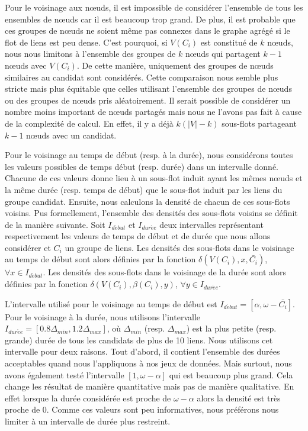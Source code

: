 Pour le voisinage aux n\oe uds, il est impossible de considérer l'ensemble de tous les ensembles de n\oe uds car il est beaucoup trop grand.
De plus, il est probable que ces groupes de n\oe uds ne soient même pas connexes dans le graphe agrégé si le flot de liens est peu dense.
C'est pourquoi, si $V(C_i)$ est constitué de $k$ n\oe uds, nous nous limitons à l'ensemble des groupes de $k$ n\oe uds qui partagent $k-1$ n\oe uds avec $V(C_i)$.
De cette manière, uniquement des groupes de n\oe uds similaires au candidat sont considérés.
Cette comparaison nous semble plus stricte mais plus équitable que celles utilisant l'ensemble des groupes de n\oe uds ou des groupes de n\oe uds pris aléatoirement.
Il serait possible de considérer un nombre moins important de n\oe uds partagés mais nous ne l'avons pas fait à cause de la complexité de calcul.
En effet, il y a déjà $k(|V|-k)$ sous-flots partageant $k-1$ n\oe uds avec un candidat.

Pour le voisinage au temps de début (resp. à la durée), nous considérons toutes les valeurs possibles de temps début (resp. durée) dans un intervalle donné.
Chacune de ces valeurs donne lieu à un sous-flot induit ayant les mêmes n\oe uds et la même durée (resp. temps de début) que le sous-flot induit par les liens du groupe candidat.
Ensuite, nous calculons la densité de chacun de ces sous-flots voisins.
Pus formellement, l'ensemble des densités des sous-flots voisins se définit de la manière suivante.
Soit $I_{d\acute{e}but}$ et $I_{dur\acute{e}e}$ deux intervalles représentant respectivement les valeurs de temps de début et de durée que nous allons considérer et $C_i$ un groupe de liens.
Les densités des sous-flots dans le voisinage au temps de début sont alors définies par la fonction $\delta(V(C_i),x, \bar{C_i})$, $\forall x \in I_{d\acute{e}but}$.
Les densités des sous-flots dans le voisinage de la durée sont alors définies par la fonction $\delta(V(C_i),\beta(C_i), y)$, $\forall y \in I_{dur\acute{e}e}$.

L'intervalle utilisé pour le voisinage au temps de début est $I_{d\acute{e}but}=[\alpha, \omega-\bar{C_i}]$.
Pour le voisinage à la durée, nous utilisons l'intervalle $I_{dur\acute{e}e}=[0.8\Delta_{min}, 1.2\Delta_{max}]$, où $\Delta_{min}$ (resp. $\Delta_{max}$) est la plus petite (resp. grande) durée de tous les candidats de plus de 10 liens.
Nous utilisons cet intervalle pour deux raisons.
Tout d'abord, il contient l'ensemble des durées acceptables quand nous l'appliquons à nos jeux de données.
Mais surtout, nous avons également testé l'intervalle $[1,\omega-\alpha]$ qui est beaucoup plus grand.
Cela change les résultat de manière quantitative mais pas de manière qualitative.
En effet lorsque la durée considérée est proche de $\omega-\alpha$ alors la densité est très proche de $0$.
Comme ces valeurs sont peu informatives, nous préférons nous limiter à un intervalle de durée plus restreint.
\bigskip

